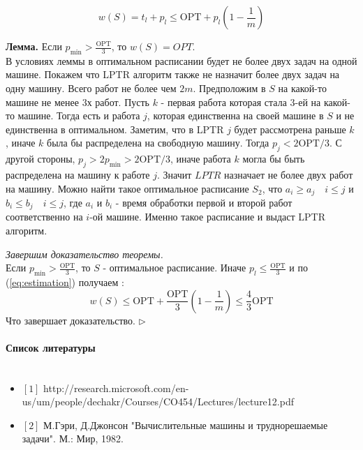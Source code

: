 \documentclass[10pt]{article}
\begin{document}
                \begin{equation} \label{eq:estimation}
                    w(S) = t_l + p_l \leq \text{OPT} + p_l (1 - \frac{1}{m}) 
                \end{equation}

                \textbf{Лемма.} Если $p_{\min} > \frac{\text{OPT}}{3}$, то $w(S) = OPT$. \\
                 В условиях леммы в оптимальном расписании будет не более двух задач на одной машине. Покажем что LPTR алгоритм также не назначит более двух задач на одну машину. Всего работ не более чем $2m$. Предположим в $S$ на какой-то машине не менее 3х работ. Пусть $k$ - первая работа которая стала 3-ей на какой-то машине. Тогда есть и работа $j$, которая единственна на своей машине в $S$  
                и не единственна в оптимальном. Заметим, что в LPTR $j$ будет рассмотрена раньше $k$ , иначе $k$ была бы распределена на свободную машину. Тогда $p_j < 2 \text{OPT} /3 $. С другой стороны, $p_j > 2 p_{\min} > 2 \text{OPT}/3$, иначе работа $k$ могла бы быть распределена на машину к работе $j$. Значит $LPTR$ назначает не более двух работ на машину. Можно найти такое оптимальное расписание $S_2$, что $a_i \geq a_j \quad i \leq j$ и $b_i \leq b_j \quad i \leq j$, где $a_i$ и $b_i$ - время обработки первой и второй работ соответственно на $i$-ой машине. Именно такое расписание и выдаст LPTR алгоритм.

                {\itshape Завершим доказательство теоремы.} \\
                Если $p_{\min} > \frac{\text{OPT}}{3}$, то $S$ - оптимальное расписание. Иначе $p_l \leq \frac{\text{OPT}}{3}$ 
                и по (\ref{eq:estimation}) получаем :
                \begin{equation}
                    w(S) \leq \text{OPT} + \frac{\text{OPT}}{3} (1 - \frac{1}{m}) \leq \frac{4}{3} \text{OPT}
                \end{equation}
                Что завершает доказательство. $\triangleright$

\paragraph{\Large{Список литературы\\\\}}
\begin{itemize}
 \item $[1]$ http://research.microsoft.com/en-us/um/people/dechakr/Courses/CO454/Lectures/lecture12.pdf
 \item $[2]$ М.Гэри, Д.Джонсон "Вычислительные машины и труднорешаемые задачи". М.: Мир, 1982.
\end{itemize}
\end{document}
